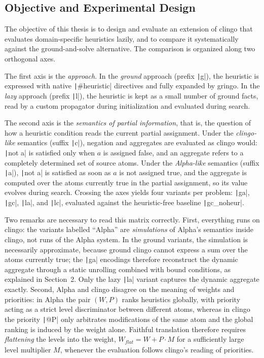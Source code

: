 \subsection{Objective and Experimental Design}

The objective of this thesis is to design and evaluate an extension of clingo that evaluates domain-specific heuristics lazily, and to compare it systematically against the ground-and-solve alternative. The comparison is organized along two orthogonal axes.

The first axis is the \emph{approach}. In the \emph{ground} approach (prefix \texttt|g|), the heuristic is expressed with native \texttt|#heuristic| directives and fully expanded by gringo. In the \emph{lazy} approach (prefix \texttt|l|), the heuristic is kept as a small number of ground facts, read by a custom propagator during initialization and evaluated during search.

The second axis is the \emph{semantics of partial information}, that is, the question of how a heuristic condition reads the current partial assignment. Under the \emph{clingo-like} semantics (suffix \texttt|c|), negation and aggregates are evaluated as clingo would: \texttt|not a| is satisfied only when $a$ is assigned false, and an aggregate refers to a completely determined set of source atoms. Under the \emph{Alpha-like} semantics (suffix \texttt|a|), \texttt|not a| is satisfied as soon as $a$ is not assigned true, and the aggregate is computed over the atoms currently true in the partial assignment, so its value evolves during search. Crossing the axes yields four variants per problem: \texttt|ga|, \texttt|gc|, \texttt|la|, and \texttt|lc|, evaluated against the heuristic-free baseline \texttt|gc_noheur|.

Two remarks are necessary to read this matrix correctly. First, everything runs on clingo: the variants labelled \enquote{Alpha} are \emph{simulations} of Alpha's semantics inside clingo, not runs of the Alpha system. In the ground variants, the simulation is necessarily approximate, because ground clingo cannot express a sum over the atoms currently true; the \texttt|ga| encodings therefore reconstruct the dynamic aggregate through a static unrolling combined with bound conditions, as explained in Section~2. Only the lazy \texttt|la| variant captures the dynamic aggregate exactly. Second, Alpha and clingo disagree on the meaning of weights and priorities: in Alpha the pair $(W,P)$ ranks heuristics globally, with priority acting as a strict level discriminator between different atoms, whereas in clingo the priority \texttt|@P| only arbitrates modifications of the same atom and the global ranking is induced by the weight alone. Faithful translation therefore requires \emph{flattening} the levels into the weight, $W_{\mathit{flat}} = W + P \cdot M$ for a sufficiently large level multiplier $M$, whenever the evaluation follows clingo's reading of priorities.


